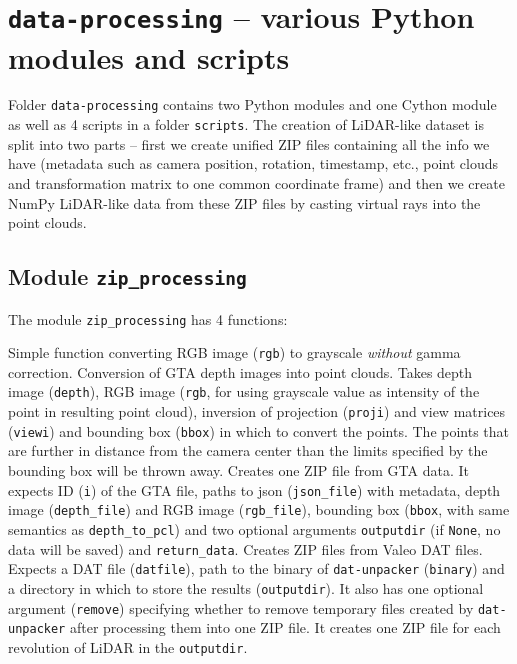 \section[\texttt{data-processing}]{\texttt{data-processing} -- various Python modules and scripts}

Folder \texttt{data-processing} contains two Python modules and one Cython module as well as 4 scripts in a folder \texttt{scripts}. The creation of LiDAR-like dataset is split into two parts -- first we create unified ZIP files containing all the info we have (metadata such as camera position, rotation, timestamp, etc., point clouds and transformation matrix to one common coordinate frame) and then we create NumPy LiDAR-like data from these ZIP files by casting virtual rays into the point clouds.

\subsection{Module \texttt{zip\_processing}}
The module \texttt{zip\_processing} has 4 functions:
\begin{description}
 Simple function converting RGB image (\texttt{rgb}) to grayscale {\em without} gamma correction.
 Conversion of GTA depth images into point clouds. Takes depth image (\texttt{depth}), RGB image (\texttt{rgb}, for using grayscale value as intensity of the point in resulting point cloud), inversion of projection (\texttt{proji}) and view matrices (\texttt{viewi}) and bounding box (\texttt{bbox}) in which to convert the points. The points that are further in distance from the camera center than the limits specified by the bounding box will be thrown away.
 Creates one ZIP file from GTA data. It expects ID (\texttt{i}) of the GTA file, paths to json (\texttt{json\_file}) with metadata, depth image (\texttt{depth\_file}) and RGB image (\texttt{rgb\_file}), bounding box (\texttt{bbox}, with same semantics as \texttt{depth\_to\_pcl}) and two optional arguments \texttt{outputdir} (if \texttt{None}, no data will be saved) and \texttt{return\_data}.
 Creates ZIP files from Valeo DAT files. Expects a DAT file (\texttt{datfile}), path to the binary of \texttt{dat-unpacker} (\texttt{binary}) and a directory in which to store the results (\texttt{outputdir}). It also has one optional argument (\texttt{remove}) specifying whether to remove temporary files created by \texttt{dat-unpacker} after processing them into one ZIP file. It creates one ZIP file for each revolution of LiDAR in the \texttt{outputdir}.
\end{description}

